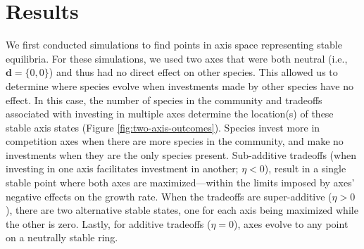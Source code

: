 \section*{Results}





We first conducted simulations to find points in axis space 
representing stable equilibria.
For these simulations, we used two axes that were both
neutral (i.e., $\mathbf{d} = \{0,0\}$) and thus had
no direct effect on other species.
This allowed us to determine where species evolve when investments
made by other species have no effect.
In this case, the number of species in the community and 
tradeoffs associated with investing in multiple axes
determine the location(s) of these stable axis states
(Figure \ref{fig:two-axis-outcomes}).
Species invest more in competition axes when there are
more species in the community, and make no investments
when they are the only species present.
Sub-additive tradeoffs 
(when investing in one axis facilitates investment in another; $\eta < 0$), 
result in a single stable point where both axes are
maximized---within the limits imposed by axes' negative effects on 
the growth rate.
When the tradeoffs are super-additive ($\eta > 0$), there are two
alternative stable states, one for each axis being maximized while the 
other is zero.
Lastly, for additive tradeoffs ($\eta = 0$), axes
evolve to any point on a neutrally stable ring.




